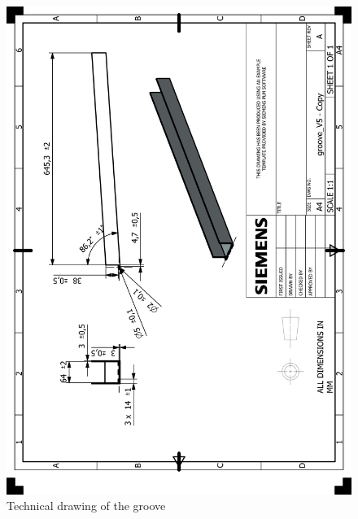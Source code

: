 \documentclass[12pt]{report}
\begin{document}
\begin{appendices}
\begin{figure}[H]
    \centering
    \includegraphics[width=\textwidth]{HP_groove_V5 - Copy.png} 
    \caption{Technical drawing of the groove}
    \label{fig:technical-drawing}
\end{figure}


\end{appendices}
\end{document}
